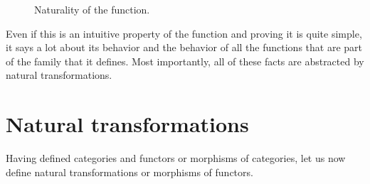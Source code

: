 \begin{figure}[htb]
  \begin{center}
  \end{center}
  \caption{Naturality of the  function.}
  \label{fig:naturality-head-haskell}
\end{figure}

Even if this is an intuitive property of the 
function and proving it is quite simple, it says a lot about its
behavior and the behavior of all the functions that are part of the
family that it defines. Most importantly, all of these facts are
abstracted by natural transformations.

\section{Natural transformations}
\label{sec:naturals}

Having defined categories and functors or morphisms of categories, let
us now define natural transformations or morphisms of functors.


